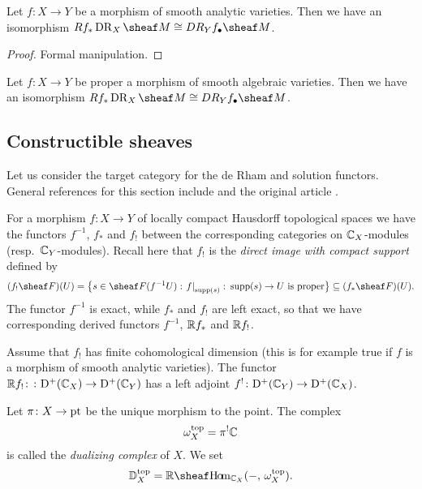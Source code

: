 \documentclass[number-in-sections,a4paper]{notes}
\begin{document}
\begin{Theorem}
    Let $f\colon X \to Y$ be a morphism of smooth analytic varieties.
    Then we have an isomorphism $Rf_*\DR_X \sheaf M \cong DR_Y f_\bullet\sheaf M$.
\end{Theorem}

\begin{proof}
    Formal manipulation.
\end{proof}

\begin{Corollary}
    Let $f\colon X \to Y$ be proper a morphism of smooth algebraic varieties.
    Then we have an isomorphism $Rf_*\DR_X \sheaf M \cong DR_Y f_\bullet\sheaf M$.
\end{Corollary}

\subsection{Constructible sheaves}

Let us consider the target category for the de Rham and solution functors.
General references for this section include \cite{Dimca:2004:SheavesInTopology,Iversen:1986:CohomologyOfSheaves,KashiwaraSchapira:1994:SheavesOnManifolds} and the original article \cite{Verdier:1966:DualiteDansLaCohomologieDesEspacesLocalementCompacts}.

For a morphism $f\colon X \to Y$ of locally compact Hausdorff topological spaces we have the functors $f^{-1}$, $f_*$ and $f_!$ between the corresponding categories on ${\mathbb{C}}_X$-modules (resp.~${\mathbb{C}}_Y$-modules).
Recall here that $f_!$ is the \emph{direct image with compact support} defined by
\[
    (f_!\sheaf F)(U) = \big\{ s \in \sheaf F(f^{-1}U) : \res{f}{\supp(s)} \colon \supp(s) \to U \text{ is proper}\big\} \subseteq (f_*\sheaf F)(U).
\]
The functor $f^{-1}$ is exact, while $f_*$ and $f_!$ are left exact, so that we have corresponding derived functors $f^{-1}$, ${\mathbb{R}} f_*$ and ${\mathbb{R}} f_!$.

\begin{Theorem}
    Assume that $f_!$ has finite cohomological dimension (this is for example true if $f$ is a morphism of smooth analytic varieties).
    The functor ${\mathbb{R}} f_!\colon \colon \mathrm{D}^{+}({\mathbb{C}}_{X}) \to \mathrm{D}^{+}({\mathbb{C}}_{Y})$ has a left adjoint $f^!\colon \mathrm{D}^{+}({\mathbb{C}}_{Y}) \to \mathrm{D}^{+}({\mathbb{C}}_{X})$.
\end{Theorem}

\begin{Definition}
    Let $\pi \colon X \to \mathrm{pt}$ be the unique morphism to the point.
    The complex
    \[
        \omega^{\mathrm{top}}_X = \pi^!{\mathbb{C}}
    \]
    is called the \emph{dualizing complex} of $X$.
    We set
    \[
        \topDD_X = \sheafRHom_{\CC_X}(-,\, \topdc_X).
    \]
\end{Definition}
\end{document}
